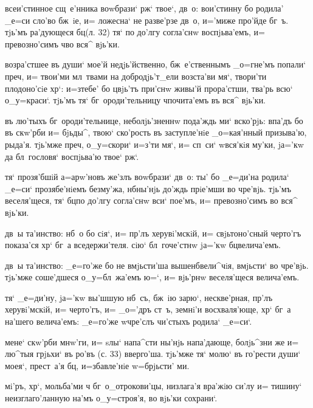  всеи'стинное сщ~е'нника воwбрази` рж` 
твое`, дв~о: вои'стинну бо родила' _е=си сло'во бж~iе, и= 
ложесна` не разве'рзе дв~о, и='миже про'йде бг~ъ. тjь'мъ 
ра'дующеся бц (л. 32) тя` по до'лгу согла'снw 
воспjьва'емъ, и= превозно'симъ ч во вся^ вjь'ки.

 возра'стшее въ души` мое'й недjь'йственно, 
бж~е'ственнымъ _о=гне'мъ попали` преч, и= твои'ми 
мл~твами на добродjь'т_ели возста'ви мя`, твори'ти 
плодоно'сiе хр`: и=з\ъ тебе' бо цвjь'тъ при'снw 
живы'й прора'стши, тва'рь всю` о_у=краси`. тjь'мъ тя` 
бг~ороди'тельницу ч почита'емъ въ вся^ вjь'ки.

  въ лю'тыхъ бг~ороди'тельнице, 
неболjь'зненнw пода'ждь ми` вско'рjь: впа'дъ бо въ 
скw'рби и= бjьды^, твою` ско'рость въ заступле'нiе 
_о=кая'нный призыва'ю, рыда'я. тjь'мже преч, 
о_у=скори` и=з'ти мя`, и= сп~си` w\т вся'кiя му'ки, 
jа='кw да бл~гословя` воспjьва'ю твое` рж`.

   тя` прозя'бшiй а=арw'новъ же'злъ 
воwбрази` дв~о: ты' бо _е=ди'на родила` _е=си` 
прозябе'нiемъ без\ъ му'жа, нб ны'нjь до'ждь прiе'мши 
во чре'вjь. тjь'мъ веселя'щеся, тя` бц по до'лгу 
согла'снw вси` пое'мъ, и= превозно'симъ во вся^ вjь'ки.


 дв~ы та'инство: нб~о бо 
сiя`, и= пр'лъ херувi'мскiй, и= свjьтоно'сный 
черто'гъ показа'ся хр` бг~а вседержи'теля. сiю` 
бл~гоче'стнw jа='кw бц велича'емъ.

 дв~ы та'инство: _е=го'же бо не вмjьсти'ша 
вышенб вели^чiя, вмjьсти` во чре'вjь. тjь'мже 
соше'дшеся о_у=бл~жа'емъ ю=`, и= вjь'рнw веселя'щеся 
велича'емъ.

 тя` _е=ди'ну, jа='кw вы'шшую нб~съ, бж~iю 
зарю`, нескве'рная, пр'лъ херувi'мскiй, и= черто'гъ, 
и= _о='дръ ст~ъ, земнi'и восхваля'юще, хр` бг~а 
на'шего велича'емъ: _е=го'же w\т чре'слъ чи'стыхъ родила` 
_е=си`.

  мене` скw'рби мнw'ги, и= sлы` 
напа^сти ны'нjь напа'дающе, болjь^зни же и= лю^тыя 
грjьхи` въ ро'въ (с. 33) вверго'ша. тjь'мже тя` молю` въ 
го'рести души` моея`, прест~а'я бц, и=збавле'нiе 
w=брjьсти' ми.

   мi'ръ, хр`, мольба'ми ч 
бг~о_отрокови'цы, низлага'я вра'жiю си'лу и= тишину` 
неизглаго'ланную на'мъ о_у=строя'я, во вjь'ки сохрани`.

